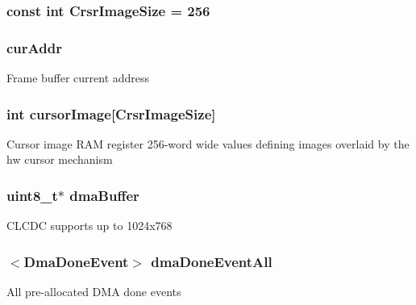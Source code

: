 \label{classPl111_afdfe18094877bc4a8436b4f34ed515f4}
\hypertarget{classPl111_aa41c0581029a0907bf48839070059c66}{
\subsubsection[{CrsrImageSize}]{\setlength{\rightskip}{0pt plus 5cm}const int {\bf CrsrImageSize} = 256}}
\label{classPl111_aa41c0581029a0907bf48839070059c66}
\hypertarget{classPl111_a791de8c75b67169bea9c7e9b56a294f7}{
\subsubsection[{curAddr}]{ {\bf curAddr}}}
\label{classPl111_a791de8c75b67169bea9c7e9b56a294f7}
Frame buffer current address \hypertarget{classPl111_a739d82d37ea9d8bad535431ceee721d6}{
\subsubsection[{cursorImage}]{\setlength{\rightskip}{0pt plus 5cm}int {\bf cursorImage}\mbox{[}{\bf CrsrImageSize}\mbox{]}}}
\label{classPl111_a739d82d37ea9d8bad535431ceee721d6}
Cursor image RAM register 256-\/word wide values defining images overlaid by the hw cursor mechanism \hypertarget{classPl111_a4ad3773f36449f12f8667bf12237f5a1}{
\subsubsection[{dmaBuffer}]{\setlength{\rightskip}{0pt plus 5cm}uint8\_\-t$\ast$ {\bf dmaBuffer}}}
\label{classPl111_a4ad3773f36449f12f8667bf12237f5a1}
CLCDC supports up to 1024x768 \hypertarget{classPl111_aa50a0179a2d530a0a45d74b014c425fe}{
\subsubsection[{dmaDoneEventAll}]{$<$DmaDoneEvent$>$ {\bf dmaDoneEventAll}}}
\label{classPl111_aa50a0179a2d530a0a45d74b014c425fe}
All pre-\/allocated DMA done events


